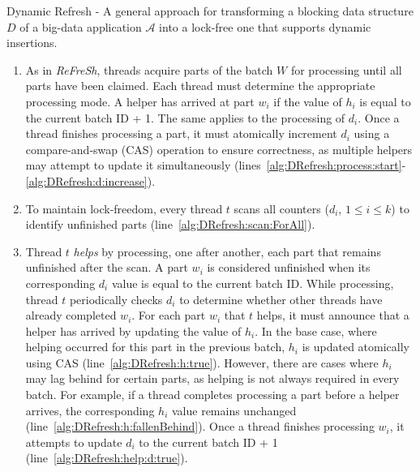 \documentclass[a4paper,11pt,twoside,openany]{book}
\begin{document}
\begin{algorithm}[htbp]
\begin{algorithmic}[1]
    \end{algorithmic}
    
    \caption{Dynamic Refresh - A general approach for transforming a blocking data structure $\mathit{D}$ of a big-data application $\mathcal{A}$ into a lock-free one that supports dynamic insertions.}
    \label{alg:DRefresh}
    \end{algorithm}

    \newpage

    \begin{enumerate}
        \item As in \textit{ReFreSh}, threads acquire parts of the batch $W$ for processing until
        all parts have been claimed. Each thread must determine the appropriate processing mode.
        A helper has arrived at part $w_i$ if the value of $h_i$ is equal to the current batch ID + 1.
        The same applies to the processing of $d_i$. Once a thread finishes processing a part, it must
        atomically increment $d_i$ using a compare-and-swap (CAS) operation to ensure correctness, as
        multiple helpers may attempt to update it simultaneously (lines~\ref{alg:DRefresh:process:start}-
        \ref{alg:DRefresh:d:increase}).  
    
        \item To maintain lock-freedom, every thread $t$ scans all counters  
        ($d_i$, $1 \leq i \leq k$) to identify unfinished parts (line~\ref{alg:DRefresh:scan:ForAll}).  
    
        \item Thread $t$ {\em helps} by processing, one after another, each part that remains unfinished  
        after the scan. A part $w_i$ is considered unfinished when its corresponding $d_i$ value  
        is equal to the current batch ID. While processing, thread $t$ periodically checks $d_i$  
        to determine whether other threads have already completed $w_i$. For each part $w_i$ that $t$
        helps, it must announce that a helper has arrived by updating the value of $h_i$.  
        In the base case, where helping occurred for this part in the previous batch, $h_i$ is updated
        atomically using CAS (line~\ref{alg:DRefresh:h:true}). However, there are cases where $h_i$
        may lag behind for certain parts, as helping is not always required in every batch. For example,
        if a thread completes processing a part before a helper arrives, the corresponding $h_i$ value
        remains unchanged (line~\ref{alg:DRefresh:h:fallenBehind}). Once a thread finishes processing
        $w_i$, it attempts to update $d_i$ to the current batch ID + 1 
        (line~\ref{alg:DRefresh:help:d:true}).  
    \end{enumerate}
    
\end{document}

